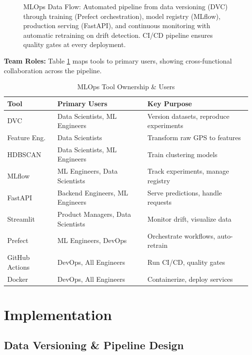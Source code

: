 \documentclass[11pt,a4paper]{article}
\begin{document}
\begin{figure}[h]
\begin{tikzpicture}
\end{tikzpicture}
\caption{MLOps Data Flow: Automated pipeline from data versioning (DVC) through training (Prefect orchestration), model registry (MLflow), production serving (FastAPI), and continuous monitoring with automatic retraining on drift detection. CI/CD pipeline ensures quality gates at every deployment.}
\label{fig:dataflow}
\end{figure}


\textbf{Team Roles:} Table \ref{tab:roles} maps tools to primary users, showing cross-functional collaboration across the pipeline.

\begin{table}[h]
\centering
\caption{MLOps Tool Ownership \& Users}
\label{tab:roles}
\small
\begin{tabular}{lll}
\toprule
\textbf{Tool} & \textbf{Primary Users} & \textbf{Key Purpose} \\
\midrule
DVC & Data Scientists, ML Engineers & Version datasets, reproduce experiments \\
Feature Eng. & Data Scientists & Transform raw GPS to features \\
HDBSCAN & Data Scientists, ML Engineers & Train clustering models \\
MLflow & ML Engineers, Data Scientists & Track experiments, manage registry \\
FastAPI & Backend Engineers, ML Engineers & Serve predictions, handle requests \\
Streamlit & Product Managers, Data Scientists & Monitor drift, visualize data \\
Prefect & ML Engineers, DevOps & Orchestrate workflows, auto-retrain \\
GitHub Actions & DevOps, All Engineers & Run CI/CD, quality gates \\
Docker & DevOps, All Engineers & Containerize, deploy services \\
\bottomrule
\end{tabular}
\end{table}

\section{Implementation}

\subsection{Data Versioning \& Pipeline Design}
\end{document}

